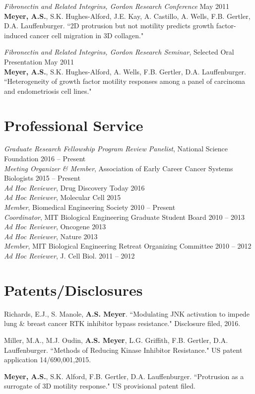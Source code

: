 \documentclass[11pt]{res}
\begin{document}
\begin{resume}
{\sl Fibronectin and Related Integrins, Gordon Research Conference} \hfill May 2011 \\
{\bf Meyer, A.S.}, S.K. Hughes-Alford, J.E. Kay, A. Castillo, A. Wells, F.B. Gertler, D.A. Lauffenburger. ``2D protrusion but not motility predicts growth factor-induced cancer cell migration in 3D collagen."

{\sl Fibronectin and Related Integrins, Gordon Research Seminar}, Selected Oral Presentation \hfill May 2011 \\
{\bf Meyer, A.S.}, S.K. Hughes-Alford, A. Wells, F.B. Gertler, D.A. Lauffenburger. ``Heterogeneity of growth factor motility responses among a panel of carcinoma and endometriosis cell lines."



\section{Professional Service}

\newcommand{\serveItem}[3]{{\sl #1}, #2 \hfill #3 \\}

\serveItem{Graduate Research Fellowship Program Review Panelist}{National Science Foundation}{2016 -- Present}
\serveItem{Meeting Organizer \& Member}{Association of Early Career Cancer Systems Biologists}{2015 -- Present}
\serveItem{Ad Hoc Reviewer}{Drug Discovery Today}{2016}
\serveItem{Ad Hoc Reviewer}{Molecular Cell}{2015}
\serveItem{Member}{Biomedical Engineering Society}{2010 -- Present}
\serveItem{Coordinator}{MIT Biological Engineering Graduate Student Board}{2010 -- 2013}
\serveItem{Ad Hoc Reviewer}{Oncogene}{2013}
\serveItem{Ad Hoc Reviewer}{Nature}{2013}
\serveItem{Member}{MIT Biological Engineering Retreat Organizing Committee}{2010 -- 2012}
\serveItem{Ad Hoc Reviewer}{J. Cell Biol.}{2011 -- 2012}

\section{Patents/Disclosures}

Richards, E.J., S. Manole, {\bf A.S. Meyer}. ``Modulating JNK activation to impede lung \& breast cancer RTK inhibitor bypass resistance." Disclosure filed, 2016.

Miller, M.A., M.J. Oudin, {\bf A.S. Meyer}, L.G. Griffith, F.B. Gertler, D.A. Lauffenburger. ``Methods of Reducing Kinase Inhibitor Resistance." US patent application 14/690,001,2015.

{\bf Meyer, A.S.}, S.K. Alford, F.B. Gertler, D.A. Lauffenburger. ``Protrusion as a surrogate of 3D motility response." US provisional patent filed.

\end{resume} 
\end{document}
